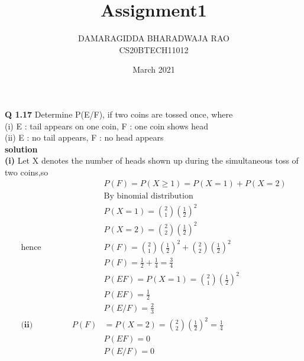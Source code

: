 \documentclass{article}
\title{Assignment1}
\author{DAMARAGIDDA BHARADWAJA RAO\\CS20BTECH11012}
\date{March 2021}
\begin{document}
\maketitle
\begin{multicols*}{2}
\noindent
\textbf{Q 1.17} Determine P(E/F), if two coins are tossed
once, where\\
(i) E : tail appears on one coin, F : one coin
shows head\\
\vspace{0.5cm}
(ii) E : no tail appears, F : no head appears\\
\textbf{solution}\\
\textbf{(i)} Let X denotes the number of heads shown up during the simultaneous toss of two coins,so 
\begin{align*}
\hspace{1cm} &P(F)=P(X\geq 1)=P(X=1)+P(X=2)\\
&\text{By binomial distribution}\\
&P(X=1)=\binom{2}{1} \left(\frac{1}{2}\right) ^2\\
&P(X=2)=\binom{2}{2} \left(\frac{1}{2}\right) ^2\\
\text{hence} &P(F) = \binom{2}{1} \left(\frac{1}{2}\right) ^2 + \binom{2}{2} \left(\frac{1}{2}\right) ^2\\
&P(F) = \frac{1}{2} + \frac{1}{4} = \frac{3}{4}\\
&P(EF) = P(X=1)=\binom{2}{1} \left(\frac{1}{2}\right) ^2\\
&P(EF) = \frac{1}{2}\\
&P(E/F) = \frac{2}{3}\\
\textbf{(ii)}\hspace{2cm} P(F) &=P(X=2)= \binom{2}{2} \left(\frac{1}{2}\right)^2 = \frac{1}{4}\\
&P(EF) = 0\\
&P(E/F) = 0
\end{align*}
\end{multicols*}
\end{document}
